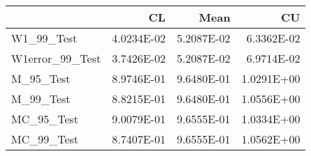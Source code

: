 \begin{tabular}{lrrr}
\toprule
{} &         CL &       Mean &         CU \\
\midrule
W1\_99\_Test      & 4.0234E-02 & 5.2087E-02 & 6.3362E-02 \\
W1error\_99\_Test & 3.7426E-02 & 5.2087E-02 & 6.9714E-02 \\
M\_95\_Test       & 8.9746E-01 & 9.6480E-01 & 1.0291E+00 \\
M\_99\_Test       & 8.8215E-01 & 9.6480E-01 & 1.0556E+00 \\
MC\_95\_Test      & 9.0079E-01 & 9.6555E-01 & 1.0334E+00 \\
MC\_99\_Test      & 8.7407E-01 & 9.6555E-01 & 1.0562E+00 \\
\bottomrule
\end{tabular}
